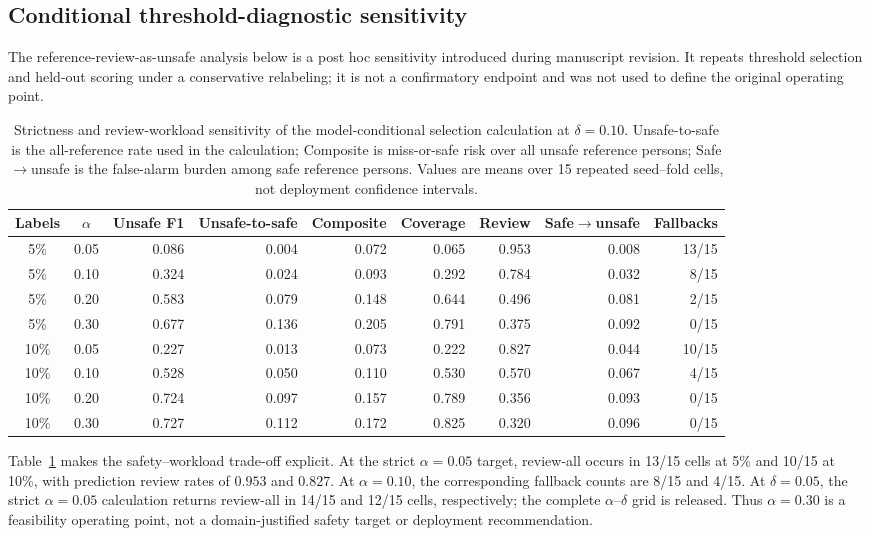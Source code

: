 \documentclass[iicol,pdflatex,sn-mathphys-num]{sn-jnl}
\begin{document}
\subsection{Conditional threshold-diagnostic sensitivity}

The reference-review-as-unsafe analysis below is a post hoc sensitivity introduced during manuscript revision. It repeats threshold selection and held-out scoring under a conservative relabeling; it is not a confirmatory endpoint and was not used to define the original operating point.

\begin{table}[t]
\caption{Strictness and review-workload sensitivity of the model-conditional selection calculation at $\delta=0.10$. Unsafe-to-safe is the all-reference rate used in the calculation; Composite is miss-or-safe risk over all unsafe reference persons; Safe$\rightarrow$unsafe is the false-alarm burden among safe reference persons. Values are means over 15 repeated seed--fold cells, not deployment confidence intervals.}
\label{tab:sensitivity}
\centering
\scriptsize
\setlength{\tabcolsep}{3pt}
\begin{tabular}{@{}ccrrrrrrr@{}}
\toprule
Labels & $\alpha$ & Unsafe F1 & Unsafe-to-safe & Composite & Coverage & Review & Safe$\rightarrow$unsafe & Fallbacks \\
\midrule
5\% & 0.05 & 0.086 & 0.004 & 0.072 & 0.065 & 0.953 & 0.008 & 13/15 \\
5\% & 0.10 & 0.324 & 0.024 & 0.093 & 0.292 & 0.784 & 0.032 & 8/15 \\
5\% & 0.20 & 0.583 & 0.079 & 0.148 & 0.644 & 0.496 & 0.081 & 2/15 \\
5\% & 0.30 & 0.677 & 0.136 & 0.205 & 0.791 & 0.375 & 0.092 & 0/15 \\
\midrule
10\% & 0.05 & 0.227 & 0.013 & 0.073 & 0.222 & 0.827 & 0.044 & 10/15 \\
10\% & 0.10 & 0.528 & 0.050 & 0.110 & 0.530 & 0.570 & 0.067 & 4/15 \\
10\% & 0.20 & 0.724 & 0.097 & 0.157 & 0.789 & 0.356 & 0.093 & 0/15 \\
10\% & 0.30 & 0.727 & 0.112 & 0.172 & 0.825 & 0.320 & 0.096 & 0/15 \\
\bottomrule
\end{tabular}
\end{table}

Table~\ref{tab:sensitivity} makes the safety--workload trade-off explicit. At the strict $\alpha=0.05$ target, review-all occurs in 13/15 cells at 5\% and 10/15 at 10\%, with prediction review rates of $0.953$ and $0.827$. At $\alpha=0.10$, the corresponding fallback counts are 8/15 and 4/15. At $\delta=0.05$, the strict $\alpha=0.05$ calculation returns review-all in 14/15 and 12/15 cells, respectively; the complete $\alpha$--$\delta$ grid is released. Thus $\alpha=0.30$ is a feasibility operating point, not a domain-justified safety target or deployment recommendation.
\end{document}
